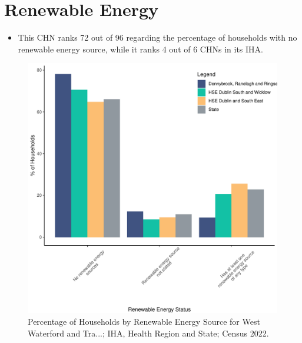 \documentclass{article}
\begin{document}
\section{Renewable Energy}\label{sect:RE}
\begin{itemize}
\item This CHN ranks  72 out of 96 regarding the percentage of households with no renewable energy source, while it ranks   4 out of 6 CHNs in its IHA.
\end{itemize}
\begin{figure}[H]
	\centering
	\includegraphics[width = 140mm]{../figures/RenewableEnergyED.pdf}
	\caption{Percentage of Households by Renewable Energy Source for West Waterford and Tra...; IHA, Health Region and State; Census 2022.}
	\label{fig:vbnv}
	\end{figure}
\end{document}
